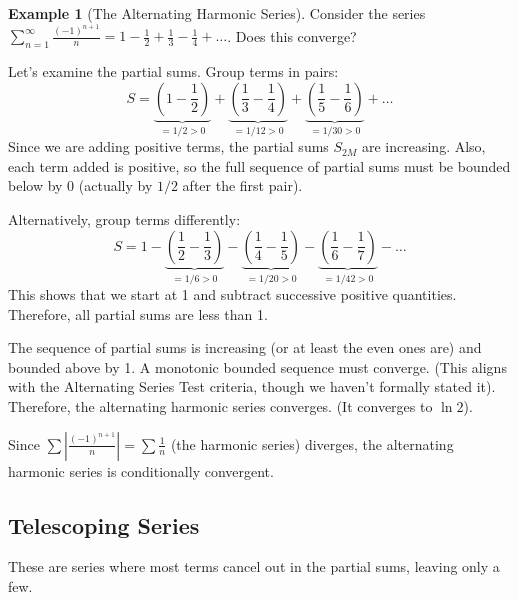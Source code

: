 \documentclass[11pt]{article}
\theoremstyle{definition}
\newtheorem{example}[theorem]{Example}
\theoremstyle{remark}
\begin{document}
\begin{example}[The Alternating Harmonic Series] \label{ex:alt_harmonic}
Consider the series $\sum_{n=1}^\infty \frac{(-1)^{n+1}}{n} = 1 - \frac{1}{2} + \frac{1}{3} - \frac{1}{4} + \dots$. Does this converge?

Let's examine the partial sums.
Group terms in pairs:
\[ S = \underbrace{\left(1 - \frac{1}{2}\right)}_{=1/2 > 0} + \underbrace{\left(\frac{1}{3} - \frac{1}{4}\right)}_{=1/12 > 0} + \underbrace{\left(\frac{1}{5} - \frac{1}{6}\right)}_{=1/30 > 0} + \dots \]
Since we are adding positive terms, the partial sums $S_{2M}$ are increasing. Also, each term added is positive, so the full sequence of partial sums must be bounded below by 0 (actually by $1/2$ after the first pair).

Alternatively, group terms differently:
\[ S = 1 - \underbrace{\left(\frac{1}{2} - \frac{1}{3}\right)}_{=1/6 > 0} - \underbrace{\left(\frac{1}{4} - \frac{1}{5}\right)}_{=1/20 > 0} - \underbrace{\left(\frac{1}{6} - \frac{1}{7}\right)}_{=1/42 > 0} - \dots \]
This shows that we start at 1 and subtract successive positive quantities. Therefore, all partial sums are less than 1.

The sequence of partial sums is increasing (or at least the even ones are) and bounded above by 1. A monotonic bounded sequence must converge. (This aligns with the Alternating Series Test criteria, though we haven't formally stated it).
Therefore, the alternating harmonic series converges. (It converges to $\ln 2$).

Since $\sum |\frac{(-1)^{n+1}}{n}| = \sum \frac{1}{n}$ (the harmonic series) diverges, the alternating harmonic series is conditionally convergent.
\end{example}

\subsection{Telescoping Series}

These are series where most terms cancel out in the partial sums, leaving only a few.
\end{document}
